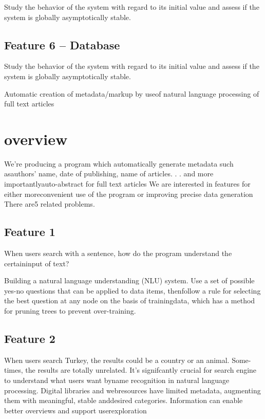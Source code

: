 \documentclass[a4paper]{article} %
\begin{document}
Study the behavior of the system with regard to its initial value and assess if the system is globally asymptotically stable.

\subsection*{Feature 6 -- Database}
\label{task1:feature6}

Study the behavior of the system with regard to its initial value and assess if the system is globally asymptotically stable.


Automatic creation of metadata/markup by useof natural language processing of full text articles

\section*{overview}
\label{task1}
We're  producing  a  program  which  automatically  generate  metadata  such  asauthors' name,  date of publishing,  name of articles. . .   and more importantlyauto-abstract for full text articles We are interested in features for either moreconvenient use of the program or improving precise data generation There are5 related problems.


\subsection*{Feature 1 }
\label{task1:feature1}
When users search with a sentence, how do the program understand the certaininput of text?

Building a natural language understanding (NLU) system.
Use a set of possible yes-no questions that can be applied to data items, thenfollow a rule for selecting the best question at any node on the basis of trainingdata, which has a method for pruning trees to prevent over-training.

\subsection*{Feature 2 }
\label{task1:feature2}

When users search Turkey, the results could be a country or an animal.  Some-times, the results are totally unrelated.
It's  signifcantly  crucial  for  search  engine  to  understand  what  users  want  byname  recognition  in  natural  language  processing.   Digital  libraries  and  webresources have limited metadata, augmenting them with meaningful, stable anddesired categories.  Information can enable better overviews and support userexploration
\end{document}
